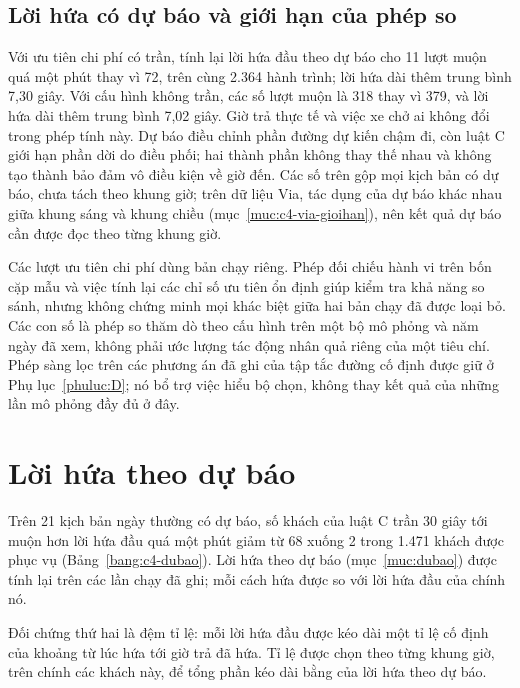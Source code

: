 \subsection{Lời hứa có dự báo và giới hạn của phép so}

Với ưu tiên chi phí có trần, tính lại lời hứa đầu theo dự báo cho 11 lượt muộn quá một phút thay vì 72,
trên cùng 2.364 hành trình; lời hứa dài thêm trung bình 7,30 giây. Với cấu hình không trần, các số lượt muộn
là 318 thay vì 379, và lời hứa dài thêm trung bình 7,02 giây. Giờ trả thực tế và việc xe chở ai không đổi
trong phép tính này. Dự báo điều chỉnh phần đường dự kiến chậm đi, còn luật C giới hạn phần dời do điều phối;
hai thành phần không thay thế nhau và không tạo thành bảo đảm vô điều kiện về giờ đến. Các số trên gộp mọi kịch bản có
dự báo, chưa tách theo khung giờ; trên dữ liệu Via, tác dụng của dự báo khác nhau giữa khung sáng và khung chiều
(mục~\ref{muc:c4-via-gioihan}), nên kết quả dự báo cần được đọc theo từng khung giờ.

Các lượt ưu tiên chi phí dùng bản chạy riêng. Phép đối chiếu hành vi trên bốn cặp mẫu và việc tính lại các
chỉ số ưu tiên ổn định giúp kiểm tra khả năng so sánh, nhưng không chứng minh mọi khác biệt giữa hai bản
chạy đã được loại bỏ. Các con số là phép so thăm dò theo cấu hình trên một bộ mô phỏng và năm ngày đã xem,
không phải ước lượng tác động nhân quả riêng của một tiêu chí. Phép sàng lọc trên các phương án đã ghi của
tập tắc đường cố định được giữ ở Phụ lục~\ref{phuluc:D}; nó bổ trợ việc hiểu bộ chọn, không thay kết quả
của những lần mô phỏng đầy đủ ở đây.


\section{Lời hứa theo dự báo}
\label{muc:c4-dubao}

Trên 21 kịch bản ngày thường có dự báo, số khách của luật C trần 30 giây tới muộn hơn lời hứa đầu quá một phút giảm từ
68 xuống 2 trong 1.471 khách được phục vụ (Bảng~\ref{bang:c4-dubao}). Lời hứa theo dự báo (mục~\ref{muc:dubao}) được
tính lại trên các lần chạy đã ghi; mỗi cách hứa được so với lời hứa đầu của chính nó.

Đối chứng thứ hai là đệm tỉ lệ: mỗi lời hứa đầu được kéo dài một tỉ lệ cố định của khoảng từ lúc hứa tới giờ trả đã
hứa. Tỉ lệ được chọn theo từng khung giờ, trên chính các khách này, để tổng phần kéo dài bằng của lời hứa theo dự báo.

